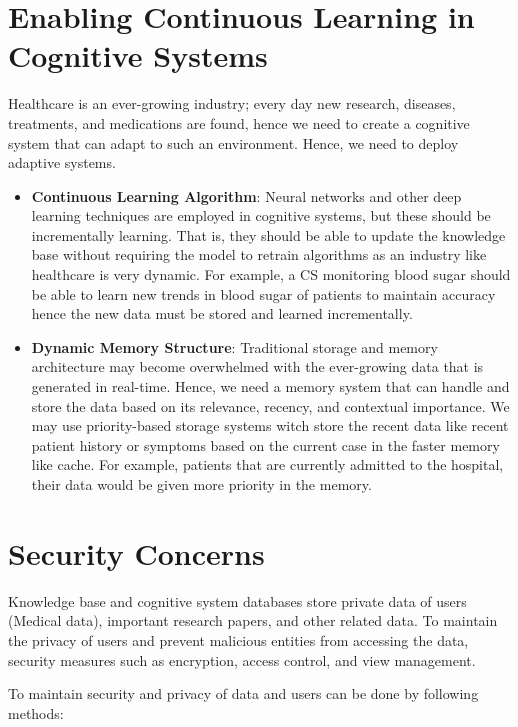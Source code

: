 \documentclass[12pt]{report}
\begin{document}
\section{Enabling Continuous Learning in Cognitive Systems}

Healthcare is an ever-growing industry; every day new research, diseases,
treatments, and medications are found, hence we need to create a cognitive
system that can adapt to such an environment. Hence, we need to deploy adaptive
systems.

\begin{itemize}
  \item \textbf{Continuous Learning Algorithm}: Neural networks and other deep
    learning techniques are employed in cognitive systems, but these should be
    incrementally learning. That is, they should be able to update the
    knowledge base without requiring the model to retrain algorithms as an
    industry like healthcare is very dynamic. For example, a CS monitoring
    blood sugar should be able to learn new trends in blood sugar of patients
    to maintain accuracy hence the new data must be stored and learned
    incrementally.
  \item \textbf{Dynamic Memory Structure}: Traditional storage and memory
    architecture may become overwhelmed with the ever-growing data that is
    generated in real-time. Hence, we need a memory system that can handle and
    store the data based on its relevance, recency, and contextual importance.
    We may use priority-based storage systems witch store the recent data like
    recent patient history or symptoms based on the current case in the faster
    memory like cache. For example, patients that are currently admitted to the
    hospital, their data would be given more priority in the memory.
\end{itemize}

\section{Security Concerns}

Knowledge base and cognitive system databases store private data of users
(Medical data), important research papers, and other related data. To maintain
the privacy of users and prevent malicious entities from accessing the data,
security measures such as encryption, access control, and view management.

To maintain security and privacy of data and users can be done by following
methods:
\end{document}

